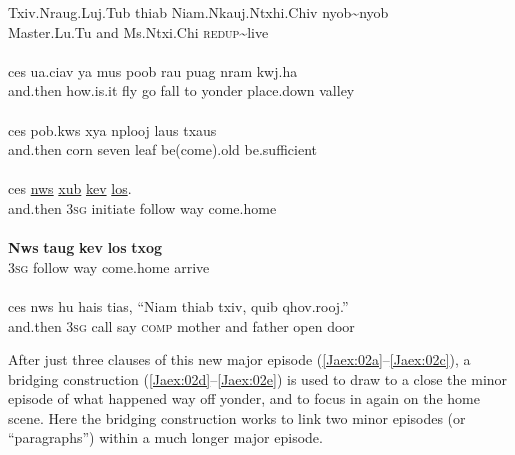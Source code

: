 \documentclass[output=paper]{LSP/langsci}
\begin{document}
\begin{exe}
\ex \label{Jaex:02af}
\begin{xlist}
\ex \label{Jaex:02a}
\gll Txiv.Nraug.Luj.Tub thiab Niam.Nkauj.Ntxhi.Chiv nyob{\textasciitilde}nyob\\
     Master.Lu.Tu       and   Ms.Ntxi.Chi \textsc{redup}{\textasciitilde}live\\
\glt {}\\
\ex \label{Jaex:02b}
\gll ces ua.ciav ya mus poob rau puag nram kwj.ha\\
and.then how.is.it fly go fall to yonder place.down valley\\ 
\glt {}\\
\ex \label{Jaex:02c}
\gll ces   pob.kws  xya  nplooj laus    txaus\\		
and.then  corn seven  leaf  be(come).old be.sufficient \\ 
\glt {}\\
\ex \label{Jaex:02d}
\gll ces \underline{nws} \underline{xub}  \underline{}  \underline{kev} \underline{los}.\\		           
and.then 3\textsc{sg} initiate follow way come.home\\
\glt {}\\
\ex \label{Jaex:02e}
\gll \textbf{Nws} \textbf{taug} \textbf{kev} \textbf{los} \textbf{txog} \\		           
 3\textsc{sg} follow way come.home  arrive\\
\glt {}\\
\ex \label{Jaex:02f}
\gll ces   nws hu  hais tias, ``Niam  thiab txiv,  quib qhov.rooj.''\\     	      
and.then 3\textsc{sg} call say \textsc{comp} mother and father open door\\
\glt {} \citep[][4]{johnson92}
\end{xlist}
\end{exe}

\noindent
After just three clauses of this new major episode (\ref{Jaex:02a}--\ref{Jaex:02c}), a bridging construction (\ref{Jaex:02d}--\ref{Jaex:02e}) is used to draw to a close the minor episode of what happened way off yonder, and to focus in again on the home scene. Here the bridging construction works to link two minor episodes (or ``paragraphs'') within a much longer major episode.
%
\end{document}
